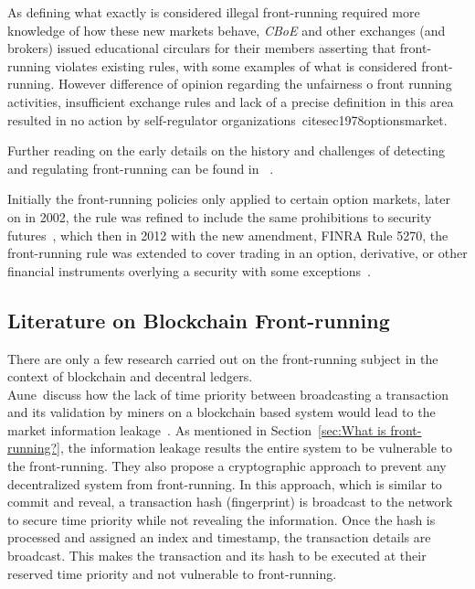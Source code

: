 As defining what exactly is considered illegal front-running required more knowledge of how these new markets behave, \textit{CBoE} and other exchanges (and brokers) issued educational circulars for their members asserting that front-running violates existing rules, with some examples of what is considered front-running. However difference of opinion regarding the unfairness o front running activities, insufficient exchange rules and lack of a precise definition in this area resulted in no action by self-regulator organizations~cite{sec1978optionsmarket}. 

Further reading on the early details on the history and challenges of detecting and regulating front-running can be found in~\cite{markham1988front} . %

Initially the front-running policies only applied to certain option markets, later on in 2002, the rule was refined to include the same prohibitions to security futures~\cite{finra_2002}, which then in 2012 with the new amendment, FINRA Rule 5270, the front-running rule was extended to cover trading in an option, derivative, or other financial instruments overlying a security with some exceptions~\cite{sec2012frontrunning, finra_2012}. 


\subsection{Literature on Blockchain Front-running}
There are only a few research carried out on the front-running subject in the context of blockchain and decentral ledgers. \\

Aune~\etal discuss how the lack of time priority between broadcasting a transaction and its validation by miners on a blockchain based system would lead to the market information leakage~\cite{aune2017footprints}. As mentioned in Section~\ref{sec:What is front-running?}, the information leakage results the entire system to be vulnerable to the front-running. They also propose a cryptographic approach to prevent any decentralized system from front-running. In this approach, which is similar to commit and reveal, a transaction hash (fingerprint) is broadcast to the network to secure time priority while not revealing the information. Once the hash is processed and assigned an index and timestamp, the transaction details are broadcast. This makes the transaction and its hash to be executed at their reserved time priority and not vulnerable to front-running.

